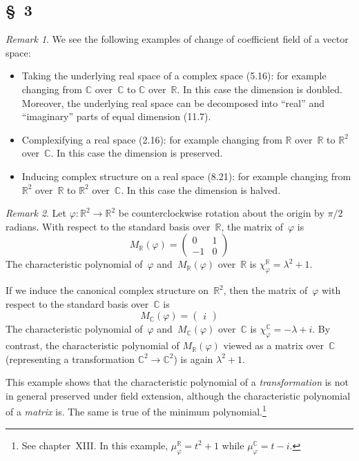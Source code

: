 \documentclass[letterpaper,12pt]{article}
\newcommand{\R}{\mathbb{R}}
\newcommand{\C}{\mathbb{C}}
\theoremstyle{definition}
\theoremstyle{remark}
\newtheorem*{rmk}{Remark}
\begin{document}
\subsection*{\S~3}
\begin{rmk}
We see the following examples of change of coefficient field of a vector space:
\begin{itemize}
\item Taking the underlying real space of a complex space (5.16): for example changing from \(\C\) over~\(\C\) to \(\C\) over~\(\R\). In this case the dimension is doubled. Moreover, the underlying real space can be decomposed into ``real'' and ``imaginary'' parts of equal dimension (11.7).
\item Complexifying a real space (2.16): for example changing from \(\R\) over~\(\R\) to \(\R^2\) over~\(\C\). In this case the dimension is preserved.
\item Inducing complex structure on a real space (8.21): for example changing from \(\R^2\) over~\(\R\) to \(\R^2\) over~\(\C\). In this case the dimension is halved.
\end{itemize}
\end{rmk}

\begin{rmk}
Let \(\varphi:\R^2\to\R^2\) be counterclockwise rotation about the origin by \(\pi/2\) radians. With respect to the standard basis over~\(\R\), the matrix of~\(\varphi\) is
\[M_{\R}(\varphi)=\begin{pmatrix}
0&1\\
-1&0
\end{pmatrix}\]
The characteristic polynomial of~\(\varphi\) and~\(M_{\R}(\varphi)\) over~\(\R\) is \(\chi_{\varphi}^{\R}=\lambda^2+1\).

If we induce the canonical complex structure on~\(\R^2\), then the matrix of~\(\varphi\) with respect to the standard basis over~\(\C\) is
\[M_{\C}(\varphi)=\begin{pmatrix}i\end{pmatrix}\]
The characteristic polynomial of~\(\varphi\) and~\(M_{\C}(\varphi)\) over~\(\C\) is \(\chi_{\varphi}^{\C}=-\lambda+i\). By contrast, the characteristic polynomial of \(M_{\R}(\varphi)\) viewed as a matrix over~\(\C\) (representing a transformation \(\C^2\to\C^2\)) is again \(\lambda^2+1\).

This example shows that the characteristic polynomial of a \emph{transformation} is not in general preserved under field extension, although the characteristic polynomial of a \emph{matrix} is. The same is true of the minimum polynomial.\footnote{See chapter~XIII. In this example, \(\mu_{\varphi}^{\R}=t^2+1\) while \(\mu_{\varphi}^{\C}=t-i\).}
\end{rmk}
\end{document}
